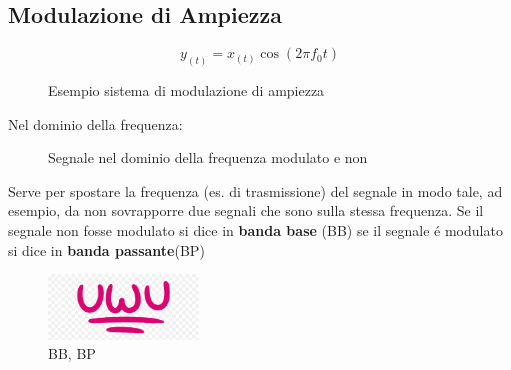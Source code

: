     \subsection{Modulazione di Ampiezza}\label{Modulazione di Ampiezza}
        \[
            y_{(t)} = x_{(t)}\cos(2\pi f_0t)
        \]
        \begin{figure}[H]
            \centering
            \hfill
            \caption{Esempio sistema di modulazione di ampiezza}
        \end{figure}
        Nel dominio della frequenza:
        \begin{figure}[H]
            \centering
            \hfill
            \caption{Segnale nel dominio della frequenza modulato e non}
        \end{figure}
        Serve per spostare la frequenza (es. di trasmissione) del segnale in modo tale, ad esempio, da non sovrapporre due segnali che sono sulla stessa frequenza.
        Se il segnale non fosse modulato si dice in \textbf{banda base} (BB) se il segnale é modulato si dice in \textbf{banda passante}(BP)
        \begin{figure}[H]
            \centering
            \includegraphics[width=4cm]{media/uwu.png}
            \caption{{\color{blue}BB}, {\color{red}BP}}
            \label{fig:bb e bp}
        \end{figure}

